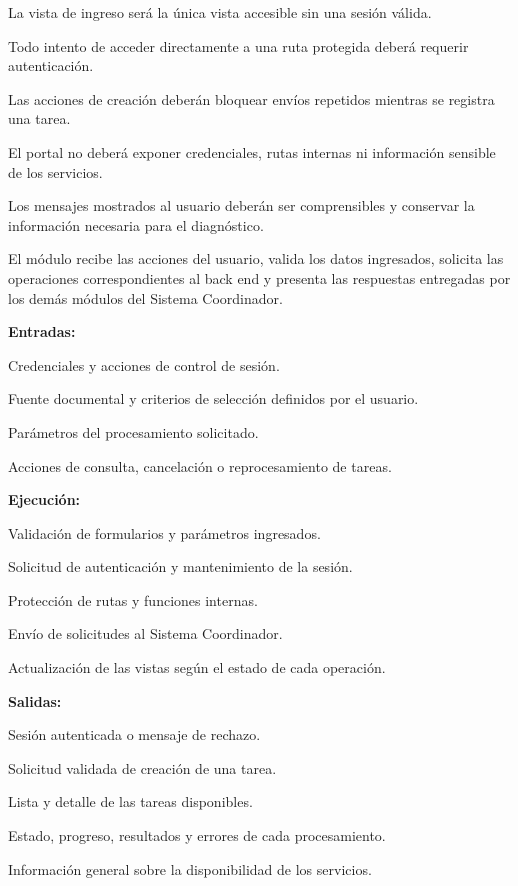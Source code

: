 \begin{definicionmodulo}
\item[Restricciones]
\begin{elementosmodulo}
    \item La vista de ingreso será la única vista accesible sin una sesión válida.
    \item Todo intento de acceder directamente a una ruta protegida deberá requerir autenticación.
    \item Las acciones de creación deberán bloquear envíos repetidos mientras se registra una tarea.
    \item El portal no deberá exponer credenciales, rutas internas ni información sensible de los servicios.
    \item Los mensajes mostrados al usuario deberán ser comprensibles y conservar la información necesaria para el diagnóstico.
\end{elementosmodulo}

\item[Estructura general] El módulo recibe las acciones del usuario, valida los datos ingresados, solicita las operaciones correspondientes al back end y presenta las respuestas entregadas por los demás módulos del Sistema Coordinador.

\textbf{Entradas:}
\begin{elementosmodulo}
    \item Credenciales y acciones de control de sesión.
    \item Fuente documental y criterios de selección definidos por el usuario.
    \item Parámetros del procesamiento solicitado.
    \item Acciones de consulta, cancelación o reprocesamiento de tareas.
\end{elementosmodulo}

\textbf{Ejecución:}
\begin{elementosmodulo}
    \item Validación de formularios y parámetros ingresados.
    \item Solicitud de autenticación y mantenimiento de la sesión.
    \item Protección de rutas y funciones internas.
    \item Envío de solicitudes al Sistema Coordinador.
    \item Actualización de las vistas según el estado de cada operación.
\end{elementosmodulo}

\textbf{Salidas:}
\begin{elementosmodulo}
    \item Sesión autenticada o mensaje de rechazo.
    \item Solicitud validada de creación de una tarea.
    \item Lista y detalle de las tareas disponibles.
    \item Estado, progreso, resultados y errores de cada procesamiento.
    \item Información general sobre la disponibilidad de los servicios.
\end{elementosmodulo}

\end{definicionmodulo}


